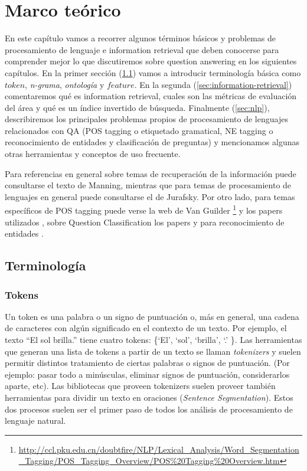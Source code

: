 
\chapter{Marco teórico}
\label{chap:teorico}

En este capítulo vamos a recorrer algunos términos básicos y problemas de procesamiento de lenguaje e information retrieval que deben conocerse para comprender mejor lo que discutiremos sobre question answering en los siguientes capítulos. En la primer sección (\ref{sec:terminologia}) vamos a introducir terminología básica como $token$, \textit{n-grama}, \textit{ontología} y $feature$. En la segunda (\ref{sec:information-retrieval}) comentaremos qué es information retrieval, cuales son las métricas de evaluación del área y qué es un índice invertido de búsqueda. Finalmente (\ref{sec:nlp}), describiremos los principales problemas propios de procesamiento de lenguajes relacionados con QA (POS tagging o etiquetado gramatical, NE tagging o reconocimiento de entidades y clasificación de preguntas) y mencionamos algunas otras herramientas y conceptos de uso frecuente. 

Para referencias en general sobre temas de recuperación de la información puede consultarse el texto de Manning\cite{MANNING-IR}, mientras que para temas de procesamiento de lenguajes en general puede consultarse el de Jurafsky\cite{POS0}. Por otro lado, para temas específicos de POS tagging puede verse la web de Van Guilder \footnote{\url{http://ccl.pku.edu.cn/doubtfire/NLP/Lexical_Analysis/Word_Segmentation_Tagging/POS_Tagging_Overview/POS\%20Tagging\%20Overview.htm}} y los papers utilizados \cite{POS1} \cite{POS2}, sobre Question Classification los papers \cite{QC2} \cite{QC1} \cite{QC3} \cite{QC-other} y para reconocimiento de entidades \cite{RE1} \newline
\cite{NER1} \cite{NER2}.


\section{Terminología}
\label{sec:terminologia}
\subsection*{Tokens}
Un token es una palabra o un signo de puntuación o, más en general, una cadena de caracteres con algún significado en el contexto de un texto.
Por ejemplo, el texto {\textquotedblleft}El sol
brilla.{\textquotedblright} tiene cuatro tokens:
\{{\textquoteleft}El{\textquoteright}, {\textquoteleft}sol{\textquoteright}, {\textquoteleft}brilla{\textquoteright}, {\textquoteleft}.{\textquoteright} \}.
Las herramientas que generan una lista de tokens a partir de un texto se llaman
\textit{tokenizers} y suelen permitir distintos tratamiento de ciertas
palabras o signos de puntuación. (Por ejemplo: pasar todo a minúsculas, eliminar signos de puntuación, considerarlos aparte, etc).
Las bibliotecas que proveen tokenizers suelen proveer también herramientas para dividir un texto en
oraciones (\textit{Sentence Segmentation}).
Estos dos procesos suelen ser el primer paso de todos los análisis de procesamiento de lenguaje natural.



